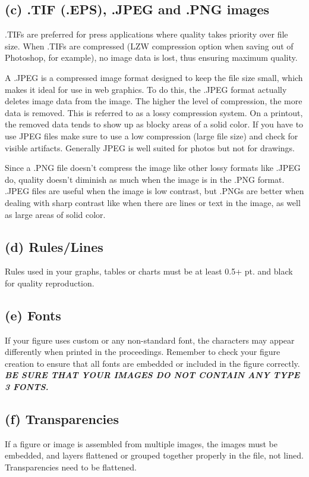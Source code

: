 \documentclass[9pt]{extarticle}
\begin{document}
\begin{multicols}{2}

\subsection{(c) .TIF (.EPS), .JPEG and .PNG images}
.TIFs are preferred for press applications where quality takes priority over file size.
When .TIFs are compressed (LZW compression option when saving out of Photoshop, for example), no image data is lost, thus ensuring maximum quality.

A .JPEG is a compressed image format designed to keep the file size small, which makes it ideal for use in web graphics.
To do this, the .JPEG format actually deletes image data from the image.
The higher the level of compression, the more data is removed.
This is referred to as a lossy compression system.
On a printout, the removed data tends to show up as blocky areas of a solid color.
If you have to use JPEG files make sure to use a low compression (large file size) and check for visible artifacts.
Generally JPEG is well suited for photos but not for drawings. 

Since a .PNG file doesn’t compress the image like other lossy formats like .JPEG do, quality doesn’t diminish as much when the image is in the .PNG format.
.JPEG files are useful when the image is low contrast, but .PNGs are better when dealing with sharp contrast like when there are lines or text in the image, as well as large areas of solid color.

\subsection{(d) Rules/Lines}
Rules used in your graphs, tables or charts must be at least 0.5+ pt. and black for quality reproduction. 

\subsection{(e) Fonts}
If your figure uses custom or any non-standard font, the characters may appear differently when printed in the proceedings.
Remember to check your figure creation to ensure that all fonts are embedded or included in the figure correctly.
\textbf{\textit{BE SURE THAT YOUR IMAGES DO NOT CONTAIN ANY TYPE 3 FONTS.}}

\subsection{(f) Transparencies}
If a figure or image is assembled from multiple images, the images must be embedded, and layers flattened or grouped together properly in the file, not lined.
Transparencies need to be flattened.


\end{multicols}
\end{document}
